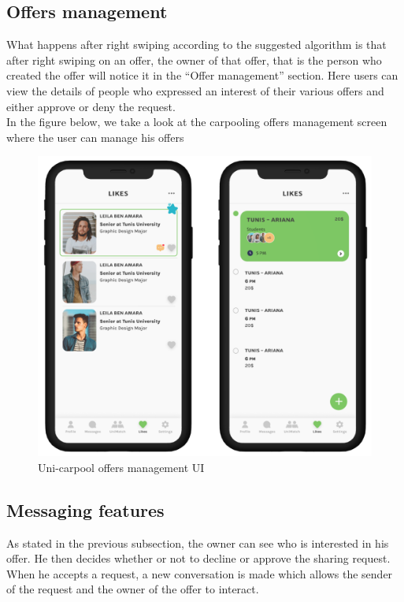 \subsection{Offers management}
What happens after right swiping according to the suggested algorithm is that after right swiping on an offer, the owner of that offer, that is the person who created the offer will notice it in the “Offer management” section. Here users can view the details of people who expressed an interest of their various offers and either approve or deny the request. \\
In the figure below, we take a look at the carpooling offers management screen where the user can manage his offers
\begin{figure}[H] 
            \centering
            \includegraphics[scale=0.2]{ui/unicarpool offer managment.png}
            \caption{Uni-carpool offers management UI} 
            \label{fig: Uni-carpool offers management UI}
\end{figure}

\subsection{Messaging features}
As stated in the previous subsection, the owner can see who is interested in his offer. He then decides whether or not to decline or approve the sharing request. When he accepts a request, a new conversation is made which allows the sender of the request and the owner of the offer to interact. \\

